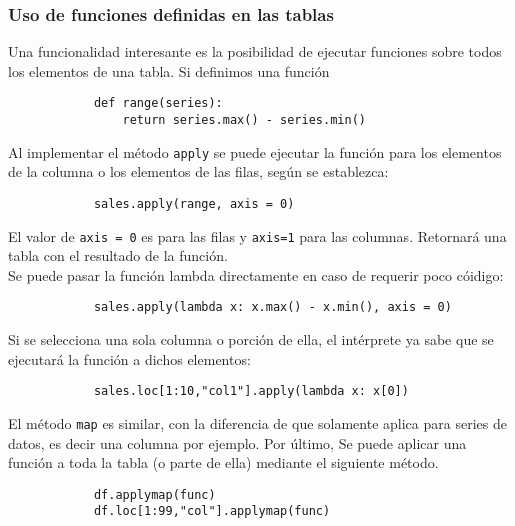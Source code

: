 \subsubsection{Uso de funciones definidas en las tablas}

\noindent Una funcionalidad interesante es la posibilidad de ejecutar funciones
sobre todos los elementos de una tabla. Si definimos una función
\begin{verbatim}
            def range(series):
                return series.max() - series.min()
            \end{verbatim}
\noindent Al implementar el método \texttt{apply} se puede ejecutar la función
para los elementos de la columna o los elementos de las filas, según se
establezca:
\begin{verbatim}
            sales.apply(range, axis = 0)
            \end{verbatim}
El valor de \texttt{axis = 0} es para las filas y \texttt{axis=1} para las
columnas. Retornará una tabla con el resultado de la función. \\
\noindent Se puede pasar la función lambda directamente en caso de requerir
poco cóidigo:
\begin{verbatim}
            sales.apply(lambda x: x.max() - x.min(), axis = 0)
            \end{verbatim}
Si se selecciona una sola columna o porción de ella, el intérprete ya sabe que
se ejecutará la función a dichos elementos:
\begin{verbatim}
            sales.loc[1:10,"col1"].apply(lambda x: x[0])
            \end{verbatim}
\noindent El método \texttt{map} es similar, con la diferencia de que solamente
aplica para series de datos, es decir una columna por ejemplo. Por último, Se
puede aplicar una función a toda la tabla (o parte de ella) mediante el
siguiente método.
\begin{verbatim}
            df.applymap(func)
            df.loc[1:99,"col"].applymap(func)
           \end{verbatim}

